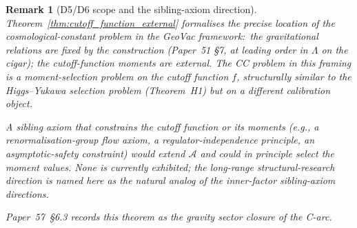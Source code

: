 \documentclass[11pt]{article}
\newtheorem{remark}{Remark}
\begin{document}
\begin{remark}[D5/D6 scope and the sibling-axiom direction]
\label{rem:d5_d6_scope}
Theorem~\ref{thm:cutoff_function_external} formalises the precise
location of the cosmological-constant problem in the GeoVac framework:\
the gravitational \emph{relations} are fixed by the construction
(Paper~51 \S 7, at leading order in $\Lambda$ on the cigar);
the cutoff-function \emph{moments} are external.  The CC problem in
this framing is a moment-selection problem on the cutoff function
$f$, structurally similar to the Higgs--Yukawa selection problem
(\emph{Theorem}~H1) but on a different calibration object.

A sibling axiom that constrains the cutoff function or its moments
(e.g., a renormalisation-group flow axiom, a regulator-independence
principle, an asymptotic-safety constraint) would extend $\mathcal{A}$
and could in principle select the moment values.  None is currently
exhibited;  the long-range structural-research direction is named
here as the natural analog of the inner-factor sibling-axiom
directions.

Paper~57~\S 6.3 records this theorem as the gravity sector closure
of the C-arc.
\end{remark}

\end{document}

